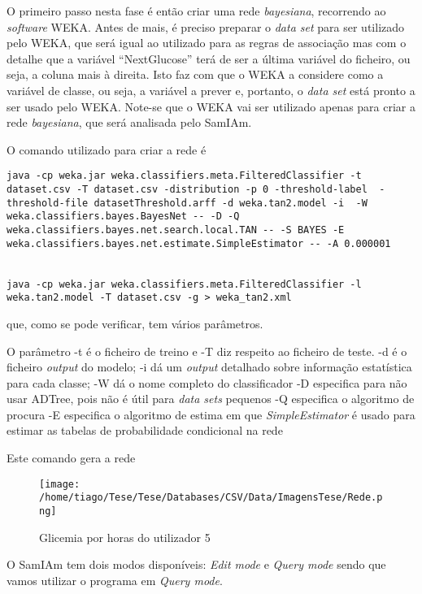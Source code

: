 O primeiro passo nesta fase é então criar uma rede \textit{bayesiana}, recorrendo ao \textit{software} WEKA. Antes de mais, é preciso preparar o \textit{data set} para ser utilizado pelo WEKA, que será igual ao utilizado para as regras de associação mas com o detalhe que a variável ``Next\textunderscore Glucose'' terá de ser a última variável do ficheiro, ou seja, a coluna mais à direita. Isto faz com que o WEKA a considere como a variável de classe, ou seja, a variável a prever e, portanto, o \textit{data set} está pronto a ser usado pelo WEKA. Note-se que o WEKA vai ser utilizado apenas para criar a rede \textit{bayesiana}, que será analisada pelo SamIAm.

O comando utilizado para criar a rede é

\begin{lstlisting}
java -cp weka.jar weka.classifiers.meta.FilteredClassifier -t dataset.csv -T dataset.csv -distribution -p 0 -threshold-label  -threshold-file datasetThreshold.arff -d weka.tan2.model -i  -W weka.classifiers.bayes.BayesNet -- -D -Q weka.classifiers.bayes.net.search.local.TAN -- -S BAYES -E weka.classifiers.bayes.net.estimate.SimpleEstimator -- -A 0.000001 


java -cp weka.jar weka.classifiers.meta.FilteredClassifier -l weka.tan2.model -T dataset.csv -g > weka_tan2.xml

\end{lstlisting}

que, como se pode verificar, tem vários parâmetros.

O parâmetro -t é o ficheiro de treino e -T diz respeito ao ficheiro de teste.
-d é o ficheiro \textit{output} do modelo;
-i dá um \textit{output} detalhado sobre informação estatística para cada classe;
-W dá o nome completo do classificador
-D especifica para não usar ADTree, pois não é útil para \textit{data sets} pequenos
-Q especifica o algoritmo de procura
-E especifica o algoritmo de estima em que \textit{SimpleEstimator} é usado para estimar as tabelas de probabilidade condicional na rede

Este comando gera a rede


\begin{figure}[H]
\centering
\texttt{[image: /home/tiago/Tese/Tese/Databases/CSV/Data/ImagensTese/Rede.png]}
\caption{Glicemia por horas do utilizador 5}
\end{figure}


O SamIAm tem dois modos disponíveis: \textit{Edit mode} e \textit{Query mode} sendo que vamos utilizar o programa em \textit{Query mode}. 

